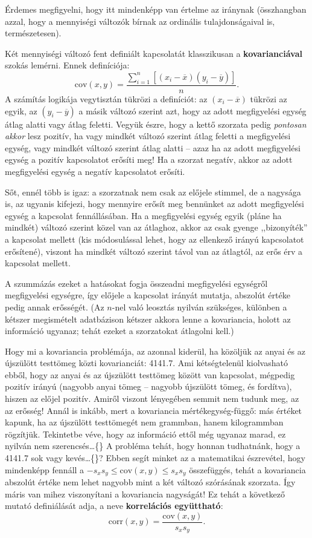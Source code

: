 \documentclass[]{book}
\begin{document}
Érdemes megfigyelni, hogy itt mindenképp van értelme az iránynak (összhangban azzal, hogy a mennyiségi változók bírnak az ordinális tulajdonságaival is, természetesen).

Két mennyiségi változó fent definiált kapcsolatát klasszikusan a \textbf{kovarianciával} szokás lemérni. Ennek definíciója:
\[
    \mathrm{cov}\left(x,y\right)=\frac{\sum_{i=1}^n \left[\left(x_i-\overline{x}\right)\left(y_i-\overline{y}\right)\right]}{n}.
\]
A számítás logikája vegytisztán tükrözi a definíciót: az \(\left(x_i-\overline{x}\right)\) tükrözi az egyik, az \(\left(y_i-\overline{y}\right)\) a másik változó szerint azt, hogy az adott megfigyelési egység átlag alatti vagy átlag feletti. Vegyük észre, hogy a kettő szorzata pedig \emph{pontosan akkor} lesz pozitív, ha vagy mindkét változó szerint átlag feletti a megfigyelési egység, vagy mindkét változó szerint átlag alatti -- azaz ha az adott megfigyelési egység a pozitív kapcsolatot erősíti meg! Ha a szorzat negatív, akkor az adott megfigyelési egység a negatív kapcsolatot erősíti.

Sőt, ennél több is igaz: a szorzatnak nem csak az előjele stimmel, de a nagysága is, az ugyanis kifejezi, hogy mennyire erősít meg bennünket az adott megfigyelési egység a kapcsolat fennállásában. Ha a megfigyelési egység egyik (pláne ha mindkét) változó szerint közel van az átlaghoz, akkor az csak gyenge ,,bizonyíték'' a kapcsolat mellett (kis módosulással lehet, hogy az ellenkező irányú kapcsolatot erősítené), viszont ha mindkét változó szerint távol van az átlagtól, az erős érv a kapcsolat mellett.

A szummázás ezeket a hatásokat fogja összeadni megfigyelési egységről megfigyelési egységre, így előjele a kapcsolat irányát mutatja, abszolút értéke pedig annak erősségét. (Az \(n\)-nel való leosztás nyilván szükséges, különben a kétszer megismételt adatbázison kétszer akkora lenne a kovariancia, holott az információ ugyanaz; tehát ezeket a szorzatokat átlagolni kell.)

Hogy mi a kovariancia problémája, az azonnal kiderül, ha közöljük az anyai és az újszülött testtömeg közti kovarianciát: 4141.7. Ami kétségtelenül kiolvasható ebből, hogy az anyai és az újszülött testtömeg között van kapcsolat, mégpedig pozitív irányú (nagyobb anyai tömeg -- nagyobb újszülött tömeg, és fordítva), hiszen az előjel pozitív. Amiről viszont lényegében semmit nem tudunk meg, az az erősség! Annál is inkább, mert a kovariancia mértékegység-függő: más értéket kapunk, ha az újszülött testtömegét nem grammban, hanem kilogrammban rögzítjük. Tekintetbe véve, hogy az információ ettől még ugyanaz marad, ez nyilván nem szerencsés\dots\{\} A probléma tehát, hogy honnan tudhatnánk, hogy a 4141.7 sok vagy kevés\dots\{\}? Ebben segít minket az a matematikai észrevétel, hogy mindenképp fennáll a \(-s_x s_y \leq \mathrm{cov}\left(x,y\right) \leq s_x s_y\) összefüggés, tehát a kovariancia abszolút értéke nem lehet nagyobb mint a két változó szórásának szorzata. Így máris van mihez viszonyítani a kovariancia nagyságát! Ez tehát a következő mutató definiálását adja, a neve \textbf{korrelációs együttható}:
\[
    \mathrm{corr}\left(x,y\right)=\frac{\mathrm{cov}\left(x,y\right)}{s_x s_y}.
\]
\end{document}
